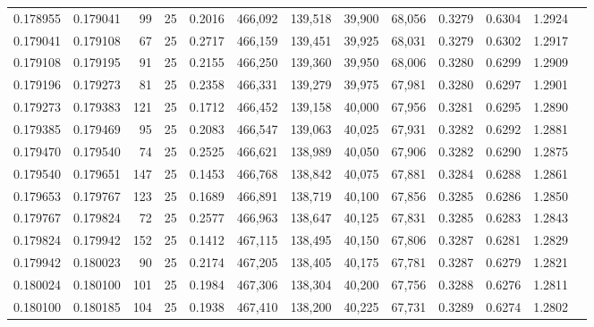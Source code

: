 \begin{tabular}{rrrrrrrrrrrrr}
0.178955 & 0.179041 &    99 &  25 &                                     0.2016 & 466,092 & 139,518 &  39,900 &  68,056 & 0.3279 & 0.6304 & 1.2924 \\
0.179041 & 0.179108 &    67 &  25 &                                     0.2717 & 466,159 & 139,451 &  39,925 &  68,031 & 0.3279 & 0.6302 & 1.2917 \\
0.179108 & 0.179195 &    91 &  25 &                                     0.2155 & 466,250 & 139,360 &  39,950 &  68,006 & 0.3280 & 0.6299 & 1.2909 \\
0.179196 & 0.179273 &    81 &  25 &                                     0.2358 & 466,331 & 139,279 &  39,975 &  67,981 & 0.3280 & 0.6297 & 1.2901 \\
0.179273 & 0.179383 &   121 &  25 &                                     0.1712 & 466,452 & 139,158 &  40,000 &  67,956 & 0.3281 & 0.6295 & 1.2890 \\
0.179385 & 0.179469 &    95 &  25 &                                     0.2083 & 466,547 & 139,063 &  40,025 &  67,931 & 0.3282 & 0.6292 & 1.2881 \\
0.179470 & 0.179540 &    74 &  25 &                                     0.2525 & 466,621 & 138,989 &  40,050 &  67,906 & 0.3282 & 0.6290 & 1.2875 \\
0.179540 & 0.179651 &   147 &  25 &                                     0.1453 & 466,768 & 138,842 &  40,075 &  67,881 & 0.3284 & 0.6288 & 1.2861 \\
0.179653 & 0.179767 &   123 &  25 &                                     0.1689 & 466,891 & 138,719 &  40,100 &  67,856 & 0.3285 & 0.6286 & 1.2850 \\
0.179767 & 0.179824 &    72 &  25 &                                     0.2577 & 466,963 & 138,647 &  40,125 &  67,831 & 0.3285 & 0.6283 & 1.2843 \\
0.179824 & 0.179942 &   152 &  25 &                                     0.1412 & 467,115 & 138,495 &  40,150 &  67,806 & 0.3287 & 0.6281 & 1.2829 \\
0.179942 & 0.180023 &    90 &  25 &                                     0.2174 & 467,205 & 138,405 &  40,175 &  67,781 & 0.3287 & 0.6279 & 1.2821 \\
0.180024 & 0.180100 &   101 &  25 &                                     0.1984 & 467,306 & 138,304 &  40,200 &  67,756 & 0.3288 & 0.6276 & 1.2811 \\
0.180100 & 0.180185 &   104 &  25 &                                     0.1938 & 467,410 & 138,200 &  40,225 &  67,731 & 0.3289 & 0.6274 & 1.2802 \\

\end{tabular}
